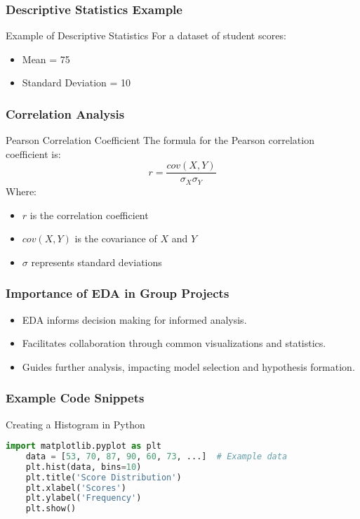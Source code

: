 \documentclass{beamer}
\begin{document}
\begin{frame}[fragile]
    \frametitle{Descriptive Statistics Example}
    \begin{block}{Example of Descriptive Statistics}
        For a dataset of student scores:
        \begin{itemize}
            \item Mean = 75
            \item Standard Deviation = 10
        \end{itemize}
    \end{block}
\end{frame}

\begin{frame}[fragile]
    \frametitle{Correlation Analysis}
    \begin{block}{Pearson Correlation Coefficient}
        The formula for the Pearson correlation coefficient is:
        \begin{equation}
            r = \frac{cov(X, Y)}{\sigma_X \sigma_Y}
        \end{equation}
        Where:
        \begin{itemize}
            \item \( r \) is the correlation coefficient
            \item \( cov(X, Y) \) is the covariance of \( X \) and \( Y \)
            \item \( \sigma \) represents standard deviations
        \end{itemize}
    \end{block}
\end{frame}

\begin{frame}
    \frametitle{Importance of EDA in Group Projects}
    \begin{itemize}
        \item EDA informs decision making for informed analysis.
        \item Facilitates collaboration through common visualizations and statistics.
        \item Guides further analysis, impacting model selection and hypothesis formation.
    \end{itemize}
\end{frame}

\begin{frame}[fragile]
    \frametitle{Example Code Snippets}
    \begin{block}{Creating a Histogram in Python}
    \begin{lstlisting}[language=Python]
    import matplotlib.pyplot as plt
    data = [53, 70, 87, 90, 60, 73, ...]  # Example data
    plt.hist(data, bins=10)
    plt.title('Score Distribution')
    plt.xlabel('Scores')
    plt.ylabel('Frequency')
    plt.show()
    \end{lstlisting}
    \end{block}
\end{frame}
\end{document}
